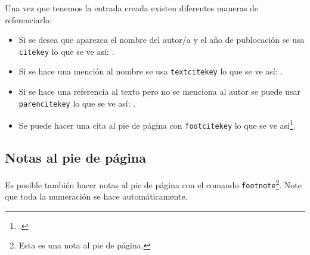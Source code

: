 Una vez que tenemos la entrada creada existen diferentes maneras de referenciarla:
\begin{itemize}
    \item Si se desea que aparezca el nombre del autor/a y el año de publocación se usa \texttt{cite{key}} lo que se ve así: \cite{Ejemplo}.
    \item Si se hace una mención al nombre se usa \texttt{textcite{key}} lo que se ve así: \textcite{Ejemplo}.
    \item Si se hace una referencia al texto pero no se menciona al autor se puede usar \texttt{parencite{key}} lo que se ve así: \parencite{Ejemplo}.
    \item Se puede hacer una cita al pie de página con \texttt{footcite{key}} lo que se ve así\footcite{Ejemplo}.
\end{itemize}

\subsection{Notas al pie de página}
Es posible también hacer notas al pie de página con el comando \texttt{footnote}\footnote{Esta es una nota al pie de página.}. Note que toda la numeración se hace automáticamente.